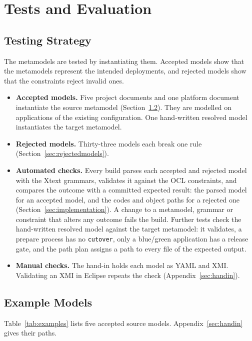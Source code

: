 \section{Tests and Evaluation}
\label{sec:tests}

\subsection{Testing Strategy}

The metamodels are tested by instantiating them. Accepted models show that the
metamodels represent the intended deployments, and rejected models show that
the constraints reject invalid ones.

\begin{itemize}
  \item \textbf{Accepted models.} Five project documents and one platform
    document instantiate the source metamodel
    (Section~\ref{sec:examplemodels}). They are modelled on applications of the
    existing configuration. One hand-written resolved model instantiates the
    target metamodel.
  \item \textbf{Rejected models.} Thirty-three models each break one rule
    (Section~\ref{sec:rejectedmodels}).
  \item \textbf{Automated checks.} Every build parses each accepted and
    rejected model with the Xtext grammars, validates it against the OCL
    constraints, and compares the outcome with a committed expected result: the
    parsed model for an accepted model, and the codes and object paths for a
    rejected one (Section~\ref{sec:implementation}). A change to a metamodel,
    grammar or constraint that alters any outcome fails the build. Further tests
    check the hand-written resolved model against the target metamodel: it
    validates, a prepare process has no \texttt{cutover}, only a blue/green
    application has a release gate, and the path plan assigns a path to every
    file of the expected output.
  \item \textbf{Manual checks.} The hand-in holds each model as YAML and XMI.
    Validating an XMI in Eclipse repeats the check (Appendix~\ref{sec:handin}).
\end{itemize}

\subsection{Example Models}
\label{sec:examplemodels}

Table~\ref{tab:examples} lists five accepted source models.
Appendix~\ref{sec:handin} gives their paths.

